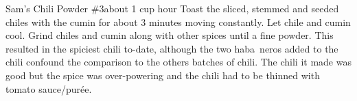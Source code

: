 \begin{recipe}{Sam's Chili Powder \#3}{about 1 cup}{ hour}
Toast the sliced, stemmed and seeded chiles with the cumin for about 3 minutes moving constantly.  Let chile and cumin cool.
Grind chiles and cumin along with other spices until a fine powder.
\freeform This resulted in the spiciest chili to-date, although the two haba~{n}eros added to the chili confound the comparison to the others batches of chili.  The chili it made was good but the spice was over-powering and the chili had to be thinned with tomato sauce/pur\'{e}e.
\end{recipe}
